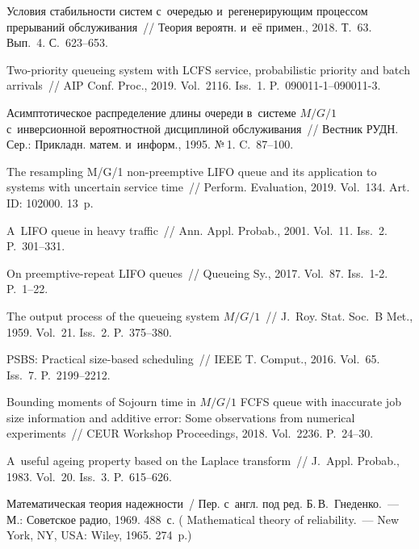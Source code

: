 \begin{multicols}{2}
{{\begin{thebibliography}{99}
Условия ста\-биль\-ности систем с~очередью и~регенерирующим 
процессом прерываний обслуживания~// Теория вероятн. и~её примен., 2018. Т.~63. 
Вып.~4. С.~623--653.

 Two-priority queueing system with LCFS service, 
probabilistic priority and batch arrivals~// AIP Conf. Proc., 2019. 
Vol.~2116. Iss.~1. P.~090011-1--090011-3.

Асимптотическое распределение длины очереди в~системе $M/G/1$ с~инверсионной
вероятностной дисциплиной обслуживания~// Вестник РУДН. Сер.: Прикладн. матем. и~информ.,
1995. №\,1. C.~87--100.

The resampling M/G/1 non-preemptive LIFO queue and its 
application to systems with uncertain service time~// Perform. Evaluation, 2019. 
Vol.~134. Art. ID: 102000. 13~p.




 A~LIFO queue in heavy traffic~// Ann. Appl. Probab., 2001. Vol.~11. Iss.~2. P.~301--331.

 On 
preemptive-repeat LIFO queues~//  Queueing Sy., 2017. 
Vol.~87. Iss.~1-2. P.~1--22.


The output process of the queueing system $M/G/1$~//
J.~Roy. Stat. Soc.~B Met., 1959. Vol.~21. Iss.~2. P.~375--380.

 PSBS: Practical size-based scheduling~// 
IEEE T. Comput., 2016.
Vol.~65. Iss.~7. P.~2199--2212.

Bounding moments of Sojourn time in $M/G/1$ FCFS queue with 
inaccurate job size information and additive error: 
Some observations from numerical experiments~// CEUR Workshop Proceedings, 2018. 
Vol.~2236. P.~24--30.


A~useful ageing property based on the Laplace transform~//
J.~Appl. Probab., 1983. Vol.~20. Iss.~3. P.~615--626.




 Математическая теория надежности~/ Пер. с~англ. под ред. 
Б.\,В.~Гнеденко.~--- М.: Советское радио, 1969. 488~с.
(  {Mathematical theory of reliability}.~---
New York, NY, USA: Wiley, 1965. 274~p.)


\end{thebibliography}}}
\end{multicols}
